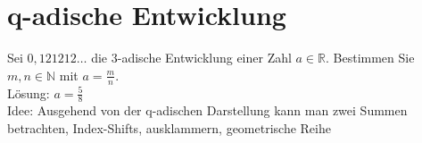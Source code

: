 \section{q-adische Entwicklung}
Sei $0,121212\dots$ die $3$-adische Entwicklung einer Zahl $a \in \mathbb{R}$. Bestimmen Sie $m, n \in \mathbb{N}$ mit $a = \frac{m}{n}$.\\
Lösung: $a = \frac{5}{8}$\\
Idee: Ausgehend von der q-adischen Darstellung kann man zwei Summen betrachten, Index-Shifts, ausklammern, geometrische Reihe 
